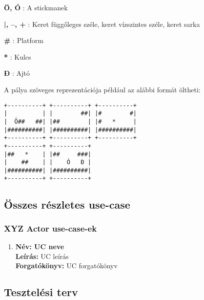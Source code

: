 	    \begin{description}
	        \newcommand{\frameitem}[1]{\item{\textbf{#1}} }
	        \frameitem{Ö, Ó}: A stickmanek
	        \frameitem{|, --, +}: Keret függőleges széle, keret vízszintes széle, keret sarka
	        \frameitem{\#}: Platform
	        \frameitem{*}: Kulcs
	        \frameitem{Đ}: Ajtó
        \end{description}

        A pálya szöveges reprezentációja például az alábbi formát öltheti:        
        \begin{verbatim}
+----------+ +----------+ +----------+
|          | |        ##| |#        #|
|  Ö##   ##| |##        | |#   *     |
|##########| |##########| |##########|
+----------+ +----------+ +----------+
+----------+ +----------+
|##   *    | |##     ###|
|    ##    | |    Ó   Đ |
|##########| |##########|
+----------+ +----------+
        \end{verbatim}
	
	\subsection{Összes részletes use-case}
        \newcommand{\ucitem}[1]{\item \textbf{Név: #1}\\}
        \newcommand{\ucdesc}[1]{\textbf{Leírás: } #1\\}
        \newcommand{\ucscenario}[1]{\textbf{Forgatókönyv: }#1\\}
        
        \subsubsection{XYZ Actor use-case-ek} %
		
	    \begin{enumerate}[label=\textbf{\arabic*.}, start=1]
	        \ucitem{UC neve} %
	        \ucdesc{UC leírás} %
	        \ucscenario{UC forgatókönyv} %
	    \end{enumerate}
	
	\subsection{Tesztelési terv}
		\newcommand{\testitem}[1]{\item \textbf{Név: #1}\\}
		\newcommand{\tdesc}[1]{\textbf{Leírás: } #1\\}
		\newcommand{\tcel}[1]{\textbf{Cél:} #1\\}
	
